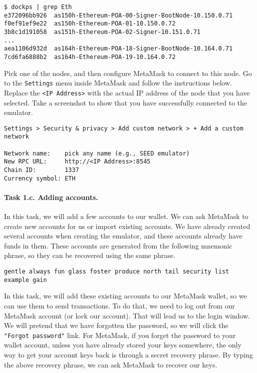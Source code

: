 \begin{lstlisting}
$ dockps | grep Eth
e372096bb926  as150h-Ethereum-POA-00-Signer-BootNode-10.150.0.71
f0ef91ef9e22  as150h-Ethereum-POA-01-10.150.0.72
3b8c1d191058  as151h-Ethereum-POA-02-Signer-10.151.0.71
...
aea1106d932d  as164h-Ethereum-POA-18-Signer-BootNode-10.164.0.71
7cd6fa6888b2  as164h-Ethereum-POA-19-10.164.0.72
\end{lstlisting}
 

Pick one of the nodes, and then configure MetaMask to connect to
this node. Go to the \texttt{Settings} menu inside MetaMask
and follow the instructions below. Replace 
the \texttt{<IP Address>} with the actual IP address of the 
node that you have selected. Take a screenshot to show that 
you have successfully connected to the emulator. 

\begin{lstlisting}
Settings > Security & privacy > Add custom network > + Add a custom network

Network name:    pick any name (e.g., SEED emulator)
New RPC URL:     http://<IP Address>:8545 
Chain ID:        1337
Currency symbol: ETH
\end{lstlisting}



\paragraph{Task 1.c. Adding accounts.} 
In this task, we will add a few accounts to our wallet. We can ask
MetaMask to create new accounts for us or import existing 
accounts. We have already created several accounts when creating the 
emulator, and these accounts already have funds in them. 
These accounts are generated from the following mnemonic phrase,
so they can be recovered using the same phrase. 

\begin{lstlisting}
gentle always fun glass foster produce north tail security list example gain
\end{lstlisting}

In this task, we will add these existing accounts to our 
MetaMask wallet, so we can use them to send transactions. 
To do that, we need to log out from our MetaMask account (or lock our 
account). That will lead us to the login window. We will pretend 
that we have forgotten the password, so we will click the 
\texttt{"Forgot password"} link. 
For MetaMask, if you forget the password to your wallet account, 
unless you have 
already stored your keys somewhere, the only way to get your account
keys back is through a secret recovery phrase. 
By typing the above recovery phrase, we can ask MetaMask to recover
our keys. 

